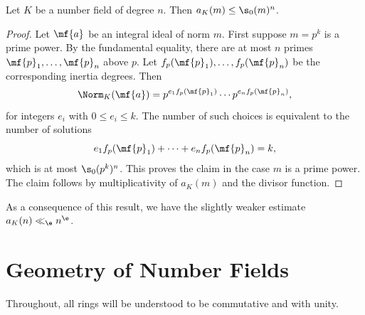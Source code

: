 \documentclass[12pt]{article}
\begin{document}
        \begin{proposition}\label{equ:ideals_of_fixed_norm_bound}
          Let \(K\) be a number field of degree \(n\). Then \(a_{K}(m) \le \s_{0}(m)^{n}\).
        \end{proposition}
        \begin{proof}
          Let \(\mf{a}\) be an integral ideal of norm \(m\). First suppose \(m = p^{k}\) is a prime power. By the fundamental equality, there are at most \(n\) primes \(\mf{p}_{1},\ldots,\mf{p}_{n}\) above \(p\). Let \(f_{p}(\mf{p}_{1}),\ldots,f_{p}(\mf{p}_{n})\) be the corresponding inertia degrees. Then
          \[
            \Norm_{K}(\mf{a}) = p^{e_{1}f_{p}(\mf{p}_{1})} \cdots p^{e_{n}f_{p}(\mf{p}_{n})},
          \]
          for integers \(e_{i}\) with \(0 \le e_{i} \le k\). The number of such choices is equivalent to the number of solutions
          \[
            e_{1}f_{p}(\mf{p}_{1})+\cdots+e_{n}f_{p}(\mf{p}_{n}) = k,
          \]
          which is at most \(\s_{0}(p^{k})^{n}\). This proves the claim in the case \(m\) is a prime power. The claim follows by multiplicativity of \(a_{K}(m)\) and the divisor function.
        \end{proof}

        As a consequence of this result, we have the slightly weaker estimate \(a_{K}(n) \ll_{\e} n^{\e}\).

  \section{Geometry of Number Fields}
    Throughout, all rings will be understood to be commutative and with unity.
\end{document}
